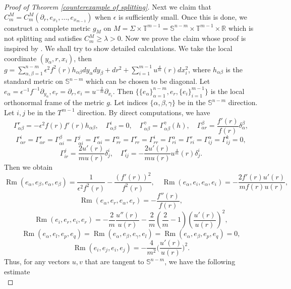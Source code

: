 \documentclass[11pt,letterpaper]{amsart}
\theoremstyle{definition}
\theoremstyle{remark}
\numberwithin{equation}{section}
\begin{document}
\begin{proof}[Proof of Theorem \ref{counterexample of splitting}]
Next we claim that $C_{m}^{M}=C_{m}^{M}(\partial_{r},e_{x_{1}},...,e_{x_{m-1}})$ when $\epsilon$ is sufficiently small. Once this is done, we construct a complete metric $g_M$ on $M=\Sigma\times \mathbb{T}^{m-1}=\mathbb{S}^{n-m}\times \mathbb{T}^{m-1}\times \mathbb{R}$ which is not splitting and satisfies $C_{m}^{M}\geq \lambda >0$.
Now we prove the claim whose proof is inspired by \cite[Theorem 1.4]{XuTrans}. We shall try to show detailed calculations. We take the local coordinate $(y_{\alpha},r,x_{i})$, then $g=\sum_{\alpha,\beta=1}^{n-m}\epsilon^2 f^2(r)h_{\alpha\beta}dy_{\alpha}dy_{\beta}+dr^2+\sum_{i=1}^{m-1}u^{\frac{4}{m}}(r)dx_{i}^{2}$, where $h_{\alpha\beta}$ is the standard metric on $\mathbb{S}^{n-m}$ which can be chosen to be diagonal. Let $e_\alpha=\epsilon^{-1}f^{-1}\partial_{y_\alpha},e_r=\partial_r,e_i=u^{-\frac{2}{m}}\partial_{x_i}$. Then $\{\{e_{\alpha}\}_{\alpha=1}^{n-m},e_{r},\{e_{i}\}_{i=1}^{m-1}\}$ is the local orthonormal frame of the metric $g$. Let indices $\{\alpha,\beta,\gamma\}$ be in the $\mathbb{S}^{n-m}$ direction. Let $i,j$ be in the $T^{m-1}$ direction. By direct computations, we have
\[
\Gamma^{r}_{\alpha\beta} = -\epsilon^2 f(r)f'(r)h_{\alpha\beta}, \quad \Gamma^{i}_{\alpha\beta}=0, \quad \Gamma^{\gamma}_{\alpha\beta}=\Gamma^{\gamma}_{\alpha\beta}(h), \quad \Gamma^{\beta}_{\alpha r}=\frac{f'(r)}{f(r)}\delta^{\beta}_{\alpha},
\]
\[
\Gamma^{i}_{\alpha r}=\Gamma^{r}_{\alpha r}=\Gamma^{\beta}_{\alpha i}=\Gamma^{j}_{\alpha i}=\Gamma^{r}_{\alpha i}=\Gamma^{\alpha}_{rr}=\Gamma^{r}_{rr}=\Gamma^{i}_{rr}=\Gamma^{\alpha}_{r i}=\Gamma^{r}_{r i}=\Gamma^{\alpha}_{ij}=\Gamma^{k}_{ij}=0,
\]
\[
\Gamma^{j}_{ir}=\frac{2u'(r)}{mu(r)}\delta^{i}_{j}, \quad \Gamma^{r}_{ij}=-\frac{2u'(r)}{mu(r)}u^{\frac{4}{m}}(r)\delta^{i}_{j}.
\]
Then we obtain
\[
\operatorname{Rm}(e_{\alpha},e_{\beta},e_{\alpha},e_{\beta})=\frac{1}{\epsilon^2f^2(r)}-\frac{(f'(r))^2}{f^2(r)}, \quad \operatorname{Rm}(e_{\alpha},e_{i},e_{\alpha},e_{i})=-\frac{2f'(r)u'(r)}{mf(r)u(r)}, 
\]
\[
\operatorname{Rm}(e_{\alpha},e_{r},e_{\alpha},e_{r})=-\frac{f''(r)}{f(r)},\] \[\operatorname{Rm}(e_{i},e_{r},e_{i},e_{r})=-\frac{2}{m}\frac{u''(r)}{u(r)}-\frac{2}{m}\left(\frac{2}{m}-1\right)\left(\frac{u'(r)}{u(r)}\right)^2,
\]
\[
\operatorname{Rm}(e_{\alpha},e_{l},e_{p},e_{q})=\operatorname{Rm}(e_{\alpha},e_{\beta},e_{\gamma},e_{l})=\operatorname{Rm}(e_{\alpha},e_{\beta},e_{p},e_{q})=0,
\]
\[ 
\operatorname{Rm}(e_{i},e_{j},e_{i},e_{j})=-\frac{4}{m^2}\Big(\frac{u'(r)}{u(r)}\Big)^2.
\]
Thus, for any vectors $ u,v$ that are tangent to $\mathbb{S}^{n-m}$, we have the following estimate
\begin{equation}\label{es1_S}

\end{equation}
\end{proof}
\end{document}
